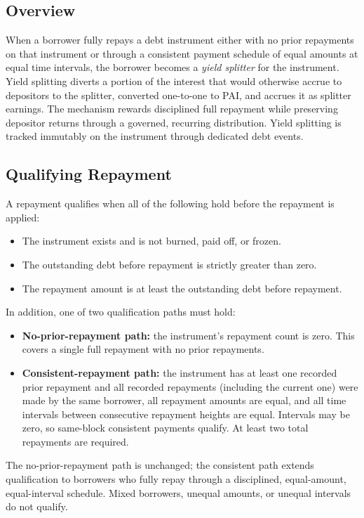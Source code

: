 \documentclass[11pt,a4paper]{article}
\begin{document}
\subsection{Overview}
When a borrower fully repays a debt instrument either with no prior repayments on that instrument or through a consistent payment schedule of equal amounts at equal time intervals, the borrower becomes a \textit{yield splitter} for the instrument. Yield splitting diverts a portion of the interest that would otherwise accrue to depositors to the splitter, converted one-to-one to PAI, and accrues it as splitter earnings. The mechanism rewards disciplined full repayment while preserving depositor returns through a governed, recurring distribution. Yield splitting is tracked immutably on the instrument through dedicated debt events.

\subsection{Qualifying Repayment}
A repayment qualifies when all of the following hold before the repayment is applied:
\begin{itemize}
\item The instrument exists and is not burned, paid off, or frozen.
\item The outstanding debt before repayment is strictly greater than zero.
\item The repayment amount is at least the outstanding debt before repayment.
\end{itemize}
In addition, one of two qualification paths must hold:
\begin{itemize}
\item \textbf{No-prior-repayment path:} the instrument's repayment count is zero. This covers a single full repayment with no prior repayments.
\item \textbf{Consistent-repayment path:} the instrument has at least one recorded prior repayment and all recorded repayments (including the current one) were made by the same borrower, all repayment amounts are equal, and all time intervals between consecutive repayment heights are equal. Intervals may be zero, so same-block consistent payments qualify. At least two total repayments are required.
\end{itemize}
The no-prior-repayment path is unchanged; the consistent path extends qualification to borrowers who fully repay through a disciplined, equal-amount, equal-interval schedule. Mixed borrowers, unequal amounts, or unequal intervals do not qualify.
\end{document}
